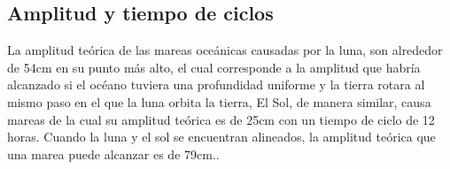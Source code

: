 \documentclass{article}
\begin{document}
\subsection{Amplitud y tiempo de ciclos}
La amplitud teórica de las mareas oceánicas causadas por la luna, son alrededor de 54cm en su punto más alto, el cual corresponde a la amplitud que habría alcanzado si el océano tuviera una profundidad uniforme y la tierra rotara al mismo paso en el que la luna orbita la tierra, El Sol, de manera similar, causa mareas de la cual su amplitud teórica es de 25cm con un tiempo de ciclo de 12 horas. Cuando la luna y el sol se encuentran alineados, la amplitud teórica que una marea puede alcanzar es de 79cm..
\end{document}
